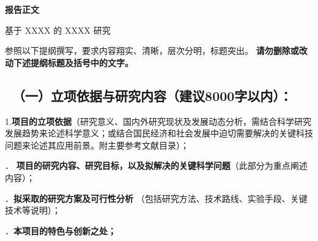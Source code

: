 \documentclass[12pt,UTF8,AutoFakeBold=3,a4paper]{ctexart} %
\newcommand{\sanhao}{\fontsize{16pt}{\baselineskip}\selectfont}
\newcommand{\sihao}{\fontsize{14pt}{\baselineskip}\selectfont}
\newcommand{\wuhao}{\fontsize{10.5pt}{\baselineskip}\selectfont}
\begin{document}
\begin{center}
{\sanhao \kaishu \bfseries 报告正文 
\par 基于 XXXX 的 XXXX 研究}
\end{center}

{\sihao \kaishu 参照以下提纲撰写，要求内容翔实、清晰，层次分明，标题突出。{\color{MsBlue} \bfseries 请勿删除或改动下述提纲标题及括号中的文字。}}
\vskip -5mm
{\color{MsBlue} \subsection{\sihao \kaishu \quad \ （一）立项依据与研究内容（建议8000字以内）：}}

{\sihao \kaishu \color{MsBlue} 1.{\bfseries 项目的立项依据}（研究意义、国内外研究现状及发展动态分析，需结合科学研究发展趋势来论述科学意义；或结合国民经济和社会发展中迫切需要解决的关键科技问题来论述其应用前景。附主要参考文献目录）；}

\vskip 2mm





% 

\begin{spacing}{1.1}
{\kaishu \wuhao


}
\end{spacing}
\newpage

\vspace{1.5 \baselineskip}
{\sihao \color{MsBlue} ． {\bfseries 项目的研究内容、研究目标，以及拟解决的关键科学问题}（此部分为重点阐述内容）；}





\newpage

{\sihao \color{MsBlue} ．{\bfseries 拟采取的研究方案及可行性分析} （包括研究方法、技术路线、实验手段、关键技术等说明）；}




\vspace{0.5 \baselineskip}
{\sihao \color{MsBlue} ．{\bfseries 本项目的特色与创新之处；}}
\vspace{0.5 \baselineskip}
\end{document}
